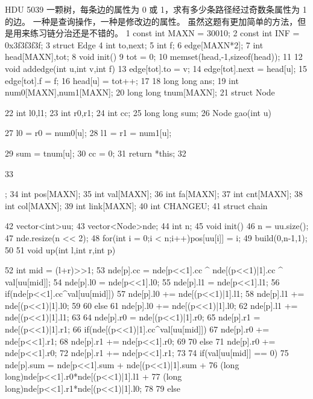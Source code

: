 \documentclass[11pt]{article}
\begin{document}
\begin{Code}
     HDU 5039 一颗树，每条边的属性为 0 或 1，求有多少条路径经过奇数条属性为 1 的边。
     一种是查询操作，一种是修改边的属性。
     虽然这题有更加简单的方法，但是用来练习链分治还是不错的。
 1   const int MAXN = 30010;
 2   const int INF = 0x3f3f3f3f;
 3   struct Edge{
 4       int to,next;
 5       int f;
 6   }edge[MAXN*2];
 7   int head[MAXN],tot;
 8   void init(){
 9       tot = 0;
10       memset(head,-1,sizeof(head));
11   }
12   void addedge(int u,int v,int f){
13       edge[tot].to = v;
14       edge[tot].next = head[u];
15       edge[tot].f = f;
16       head[u] = tot++;
17   }
18   long long ans;
19   int num0[MAXN],num1[MAXN];
20   long long tnum[MAXN];
21   struct Node{
22       int l0,l1;
23       int r0,r1;
24       int cc;
25       long long sum;
26       Node gao(int u){
27           l0 = r0 = num0[u];
28           l1 = r1 = num1[u];


29              sum = tnum[u];
30              cc = 0;
31              return *this;
32       }
33   };
34   int pos[MAXN];
35   int val[MAXN];
36   int fa[MAXN];
37   int cnt[MAXN];
38   int col[MAXN];
39   int link[MAXN];
40   int CHANGEU;
41   struct chain{
42       vector<int>uu;
43       vector<Node>nde;
44       int n;
45       void init(){
46           n = uu.size();
47           nde.resize(n << 2);
48           for(int i = 0;i < n;i++)pos[uu[i]] = i;
49           build(0,n-1,1);
50       }
51       void up(int l,int r,int p){
52           int mid = (l+r)>>1;
53           nde[p].cc = nde[p<<1].cc ^ nde[(p<<1)|1].cc ^ val[uu[mid]];
54           nde[p].l0 = nde[p<<1].l0;
55           nde[p].l1 = nde[p<<1].l1;
56           if(nde[p<<1].cc^val[uu[mid]]){
57                nde[p].l0 += nde[(p<<1)|1].l1;
58                nde[p].l1 += nde[(p<<1)|1].l0;
59           }
60           else {
61                nde[p].l0 += nde[(p<<1)|1].l0;
62                nde[p].l1 += nde[(p<<1)|1].l1;
63           }
64           nde[p].r0 = nde[(p<<1)|1].r0;
65           nde[p].r1 = nde[(p<<1)|1].r1;
66           if(nde[(p<<1)|1].cc^val[uu[mid]]){
67                nde[p].r0 += nde[p<<1].r1;
68                nde[p].r1 += nde[p<<1].r0;
69           }
70           else {
71                nde[p].r0 += nde[p<<1].r0;
72                nde[p].r1 += nde[p<<1].r1;
73           }
74           if(val[uu[mid]] == 0){
75                nde[p].sum = nde[p<<1].sum + nde[(p<<1)|1].sum +
76                    (long long)nde[p<<1].r0*nde[(p<<1)|1].l1 +
77                    (long long)nde[p<<1].r1*nde[(p<<1)|1].l0;
78           }
79           else {


}}}
\end{Code}
\end{document}
